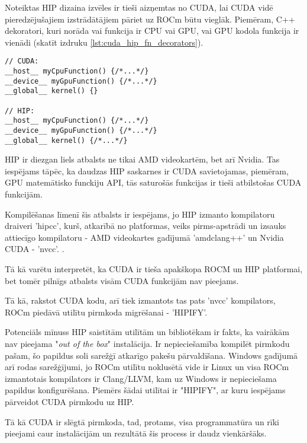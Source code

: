 \documentclass[12pt]{report}%
\theoremstyle{definition}
\begin{document}
Noteiktas HIP dizaina izvēles ir tieši aizņemtas no CUDA, lai CUDA vidē pieredzējušajiem
izstrādātājiem pāriet uz ROCm būtu vieglāk. Piemēram, C++ dekoratori, kuri norāda vai funkcija ir CPU
vai GPU, vai GPU kodola funkcija ir vienādi (skatīt  izdruku \ref{lst:cuda_hip_fn_decorators}).

\begin{lstlisting}[caption={CUDA un HIP funkciju definīciju salīdzinājums},
  label=lst:cuda_hip_fn_decorators,
  captionpos=t
]
// CUDA:
__host__ myCpuFunction() {/*...*/}
__device__ myGpuFunction() {/*...*/}
__global__ kernel() {}

// HIP:
__host__ myCpuFunction() {/*...*/}
__device__ myGpuFunction() {/*...*/}
__global__ kernel() {/*...*/}
\end{lstlisting}

HIP ir diezgan liels atbalsts ne tikai AMD videokartēm, bet arī Nvidia. Tas iespējams tāpēc, ka 
daudzas HIP saskarnes ir CUDA savietojamas, piemēram, GPU matemātisko funckiju API, tās saturošās funkcijas
ir tieši atbilstošas CUDA funkcijām.\cite{HIP_math_API,CUDA_math_API}

Kompilēšanas līmenī šis atbalsts ir iespējams, jo HIP izmanto kompilatoru draiveri 'hipcc', kurš,
atkarībā no platformas, veiks pirms-apstrādi un izsauks attiecīgo kompilatoru -
AMD videokartes gadījumā 'amdclang++' un Nvidia CUDA - 'nvcc'. \cite{HIP_compilers}.

Tā kā varētu interpretēt, ka CUDA ir tieša apakškopa ROCM un HIP platformai, bet tomēr pilnīgs atbalsts
visām CUDA funkcijām nav pieejams.



Tā kā, rakstot CUDA kodu, arī tiek izmantots tas pats 'nvcc' kompilators, ROCm piedāvā utilītu
pirmkoda migrēšanai - 'HIPIFY'. \cite{HIPIFY_github}

Potenciāls mīnuss HIP saistītām utilītām un bibliotēkam ir fakts, ka vairākām nav pieejama
"\textit{out of the box}" instalācija. Ir nepieciešamība kompilēt pirmkodu pašam, šo papildus soli
sarežģī atkarīgo pakešu pārvaldīšana. Windows gadījumā arī rodas sarežģījumi, jo ROCm utilītu noklusētā vide
ir Linux un visa ROCm izmantotais kompilators ir Clang/LLVM, kam uz Windows ir nepieciešama papildus 
konfigurēšana.
Piemērs šādai utilītai ir "HIPIFY", ar kuru iespējams pārveidot CUDA pirmkodu uz HIP. \cite{HIPIFY_github}

Tā kā CUDA ir slēgtā pirmkoda, tad, protams, visa programmatūra un rīki pieejami caur instalācijām un
rezultātā šis process ir daudz vienkāršāks.
\end{document}
